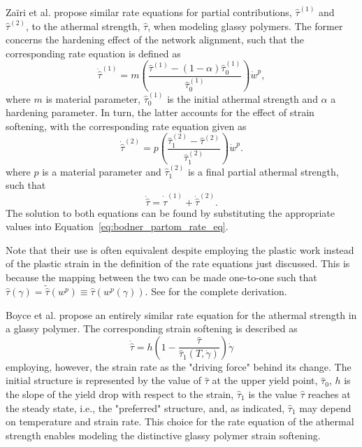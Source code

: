 Zaïri et al. \citep{zairiElastoviscoplasticConstitutiveEquations2007} propose similar rate equations for partial contributions, $\hat \tau^{(1)}$ and $\hat \tau^{(2)}$, to the athermal strength, $\hat \tau$, when modeling glassy polymers.
The former concerns the hardening effect of the network alignment, such that the corresponding rate equation is defined as
\begin{equation}
  \dot{\hat\tau}^{(1)} = m\left(\frac{\hat\tau^{(1)} - (1 - \alpha)\hat\tau^{(1)}_0}{\hat\tau^{(1)}_0}\right)\dot w^p,
\end{equation}
where $m$ is material parameter, $\hat\tau^{(1)}_0$ is the initial athermal strength and $\alpha$ a hardening parameter.
In turn, the latter accounts for the effect of strain softening, with the corresponding rate equation given as
\begin{equation}
  \dot{\hat\tau}^{(2)} = p\left(\frac{\hat\tau^{(2)}_1 - \hat\tau^{(2)}}{\hat\tau^{(2)}_1}\right)\dot w^p.
\end{equation}
where $p$ is a material parameter and $\hat\tau^{(2)}_1$ is a final partial athermal strength, such that
\begin{equation}
  \label{eq:rate_eq_zairi}
  \dot{\hat \tau} = \dot{\hat\tau}^{(1)} + \dot{\hat\tau}^{(2)}.
\end{equation}
The solution to both equations can be found by substituting the appropriate values into Equation~\eqref{eq:bodner_partom_rate_eq}.

Note that their use is often equivalent despite employing the plastic work instead of the plastic strain in the definition of the rate equations just discussed.
This is because the mapping between the two can be made one-to-one such that $\hat \tau(\gamma)=\tilde{\hat \tau}(w^p)\equiv \hat\tau(w^p(\gamma))$.
See \cite{desouzanetoComputationalMethodsPlasticity2008} for the complete derivation.

Boyce et al. \cite{boyceLargeInelasticDeformation1988} propose an entirely similar rate equation for the athermal strength in a glassy polymer.
The corresponding strain softening is described as
\begin{equation}
  \label{eq:rate_equation_bpa}
	\dot{\hat \tau}=h \left(1-\frac{\hat \tau}{\hat \tau_{1} \left(T, \dot{\gamma}\right)}\right)\dot{\gamma}
\end{equation}
employing, however, the strain rate as the "driving force" behind its change.
The initial structure is represented by the value of $\hat \tau$ at the upper yield point, $\hat \tau_0$, $h$ is the slope of the yield drop with respect to the strain, $\hat \tau_1$ is the value $\hat \tau$ reaches at the steady state, i.e., the "preferred" structure, and, as indicated, $\hat \tau_1$ may depend on temperature and strain rate.
This choice for the rate equation of the athermal strength enables modeling the distinctive glassy polymer strain softening.

